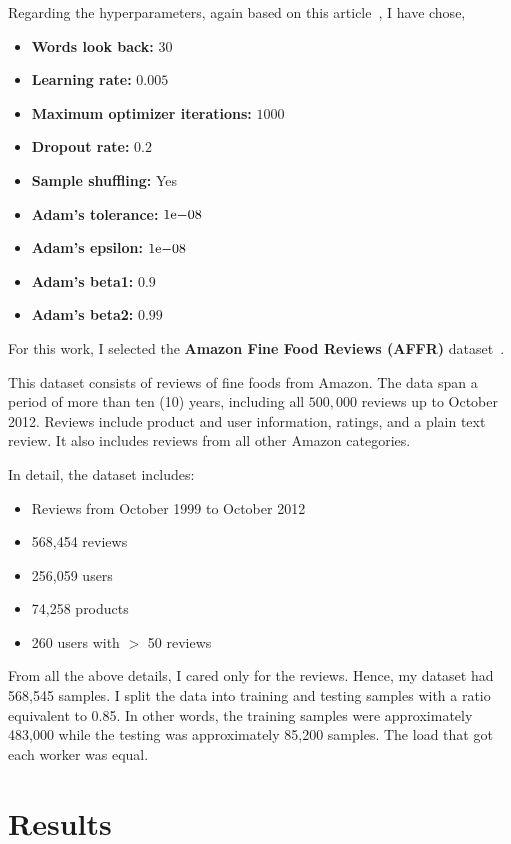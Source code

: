 Regarding the hyperparameters, again based on this article~\cite{rushabhwadkar_2019}, I have chose,
\begin{itemize}
    \item \textbf{Words look back:} $30$
    \item \textbf{Learning rate:} $0.005$
    \item \textbf{Maximum optimizer iterations:} $1000$
    \item \textbf{Dropout rate:} $0.2$
    \item \textbf{Sample shuffling:} Yes
    \item \textbf{Adam's tolerance:} ${1}\mathrm{e}{-08}$
    \item \textbf{Adam's epsilon:} ${1}\mathrm{e}{-08}$
    \item \textbf{Adam's beta1:} $0.9$
    \item \textbf{Adam's beta2:} $0.99$
\end{itemize}

For this work, I selected the \textbf{Amazon Fine Food Reviews (AFFR)} dataset~\cite{amazon_dataset}.

This dataset consists of reviews of fine foods from Amazon.
The data span a period of more than ten (10) years, including all $500,000$ reviews up to October 2012.
Reviews include product and user information, ratings, and a plain text review.
It also includes reviews from all other Amazon categories.

In detail, the dataset includes:

\begin{itemize}
    \item Reviews from October 1999 to October 2012
    \item 568,454 reviews
    \item 256,059 users
    \item 74,258 products
    \item 260 users with $>$ 50 reviews

\end{itemize}

From all the above details, I cared only for the reviews.
Hence, my dataset had 568,545 samples.
I split the data into training and testing samples with a ratio equivalent to 0.85.
In other words, the training samples were approximately 483,000 while the testing was approximately 85,200 samples.
The load that got each worker was equal.

\newpage

\section{Results}\label{sec:results}

